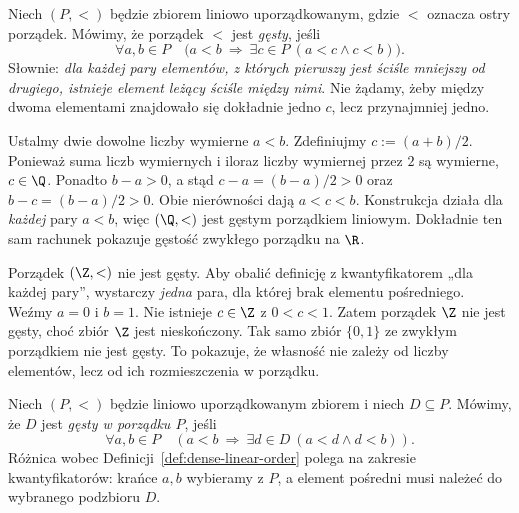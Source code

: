 \begin{definicja}\label{def:dense-linear-order}
Niech $(P,<)$ będzie zbiorem liniowo uporządkowanym,
gdzie $<$ oznacza ostry porządek. Mówimy, że porządek $<$
jest \emph{gęsty}, jeśli
\[
 \forall a,b\in P\quad
 \bigl(a<b\ \Longrightarrow\ \exists c\in P\ (a<c\land c<b)\bigr).
\]
Słownie: \emph{dla każdej pary elementów, z których pierwszy jest
ściśle mniejszy od drugiego, istnieje element leżący ściśle między nimi}.
Nie żądamy, żeby między dwoma elementami znajdowało się dokładnie
jedno $c$, lecz przynajmniej jedno.
\end{definicja}

\begin{przyklad}
Ustalmy dwie dowolne liczby wymierne $a<b$.
Zdefiniujmy $c:=(a+b)/2$.
Ponieważ suma liczb wymiernych i iloraz liczby wymiernej
przez $2$ są wymierne, $c\in\Q$.
Ponadto $b-a>0$, a stąd
$c-a=(b-a)/2>0$ oraz $b-c=(b-a)/2>0$.
Obie nierówności dają $a<c<b$.
Konstrukcja działa dla \emph{każdej} pary $a<b$, więc
$(\Q,<)$ jest gęstym porządkiem liniowym.
Dokładnie ten sam rachunek pokazuje gęstość zwykłego
porządku na $\R$.
\end{przyklad}

\begin{przyklad}
Porządek $(\Z,<)$ nie jest gęsty. Aby obalić definicję
z kwantyfikatorem „dla każdej pary”, wystarczy \emph{jedna}
para, dla której brak elementu pośredniego.
Weźmy $a=0$ i $b=1$. Nie istnieje $c\in\Z$
z $0<c<1$. Zatem porządek $\Z$ nie jest gęsty,
choć zbiór $\Z$ jest nieskończony.
Tak samo zbiór $\{0,1\}$ ze zwykłym porządkiem
nie jest gęsty. To pokazuje, że własność nie zależy
od liczby elementów, lecz od ich rozmieszczenia w porządku.
\end{przyklad}

\begin{definicja}\label{def:order-dense-subset}
Niech $(P,<)$ będzie liniowo uporządkowanym zbiorem
i niech $D\subseteq P$. Mówimy, że $D$ jest
\emph{gęsty w porządku $P$}, jeśli
\[
 \forall a,b\in P\quad
 (a<b\ \Longrightarrow\ \exists d\in D\ (a<d\land d<b)).
\]
Różnica wobec Definicji~\ref{def:dense-linear-order} polega
na zakresie kwantyfikatorów: krańce $a,b$ wybieramy z $P$,
a element pośredni musi należeć do wybranego podzbioru $D$.
\end{definicja}

